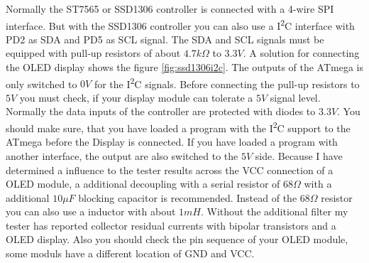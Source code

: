 Normally the ST7565 or SSD1306 controller is connected with a 4-wire SPI interface.
But with the SSD1306 controller you can also use a I\textsuperscript{2}C interface with PD2 as SDA and PD5 as SCL signal.
The SDA and SCL signals must be equipped with pull-up resistors of about \(4.7k\Omega\) to \(3.3V\).
A solution for connecting the OLED display shows the figure  \ref{fig:ssd1306i2c}.
The outputs of the ATmega is only switched to \(0V\) for the I\textsuperscript{2}C signals.
Before connecting the pull-up resistors to \(5V\) you must check, if your display module can tolerate
a \(5V\) signal level. Normally the data inputs of the controller are protected with diodes to \(3.3V\).
You should make sure, that you have loaded a program with the I\textsuperscript{2}C support to the ATmega 
before the Display is connected. If you have loaded a program with another interface, 
the output are also switched to the \(5V\) side.
Because I have determined a influence to the tester results across the VCC connection of a OLED module,
a additional decoupling with a serial resistor of \(68\Omega\) with a additional \(10\mu F\) blocking capacitor
is recommended. Instead of the \(68\Omega\) resistor you can also use a inductor with about \(1mH\).
Without the additional filter my tester has reported collector residual currents with bipolar transistors and a
OLED display.
Also you should check the pin sequence of your OLED module, some moduls have a different location of GND and VCC.
 
